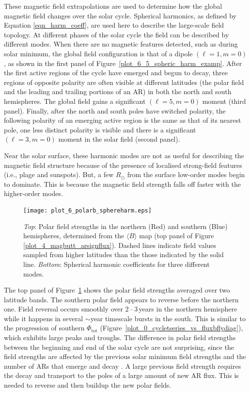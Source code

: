 These magnetic field extrapolations are used to determine how the global magnetic field changes over the solar cycle. Spherical harmonics, as defined by Equation \ref{eqn_harm_coeff}, are used here to describe the large-scale field topology. At different phases of the solar cycle the field can be described by different modes. When there are no magnetic features detected, such as during solar minimum, the global field configuration is that of a dipole $(\ell=1,m=0)$, as shown in the first panel of Figure~\ref{plot_6_5_spheric_harm_examp}. After the first active regions of the cycle have emerged and begun to decay, three regions of opposite polarity are often visible at different latitudes (the polar field and the leading and trailing portions of an \gls{AR}) in both the north and south hemispheres. The global field gains a significant $(\ell=5,m=0)$ moment (third panel). Finally, after the north and south poles have switched polarity, the following polarity of an emerging active region is the same as that of its nearest pole, one less distinct polarity is visible and there is a significant $(\ell=3,m=0)$ moment in the solar field (second panel). 

Near the solar surface, these harmonic modes are not as useful for describing the magnetic field structure because of the presence of localised strong-field features (i.e., plage and sunspots). But, a few $R_\odot$ from the surface low-order modes begin to dominate. This is because the magnetic field strength falls off faster with the higher-order modes.


\begin{figure}[!t]
\centerline{\texttt{[image: plot\_6\_polarb\_sphereharm.eps]}}
\caption[Global magnetic field spherical harmonic strengths over time.]{\emph{Top}: Polar field strengths in the northern (Red) and southern (Blue) hemispheres, determined from the $\langle B \rangle$ map (top panel of Figure\,\ref{plot_4_magbutt_arsignflux}). Dashed lines indicate field values sampled from higher latitudes than the those indicated by the solid line.  \emph{Bottom}: Spherical harmonic coefficients for three different modes.}
\label{plot_6_polarb_sphereharm}
\end{figure}

The top panel of Figure~\ref{plot_6_polarb_sphereharm} shows the polar field strengths averaged over two latitude bands. The southern polar field appears to reverse before the northern one. Field reversal occurs smoothly over 2\,--\,3\,years in the northern hemisphere while it happens in several $\sim$year timescale bursts in the south. This is similar to the progression of southern $\Phi_{\mathrm{tot}}$ (Figure~\ref{plot_0_cycletseries_vs_fluxbflydiag}), which exhibits large peaks and troughs. The difference in polar field strengths between the beginning and end of the solar cycle are not surprising, since the field strengths are affected by the previous solar minimum field strengths and the number of \glspl{AR} that emerge and decay \cite[][ and references therein]{Petrovay:2010}. A large previous field strength requires the decay and transport to the poles of a large amount of new \gls{AR} flux. This is needed to reverse and then buildup the new polar fields.

